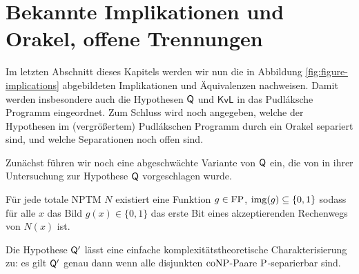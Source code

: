 \section{Bekannte Implikationen und Orakel, offene Trennungen}\label{sec:pudlak-overview}

Im letzten Abschnitt dieses Kapitels werden wir nun die in Abbildung \ref{fig:figure-implications} abgebildeten Implikationen und Äquivalenzen nachweisen.
Damit werden insbesondere auch die Hypothesen $\hQ$ und $\mathsf{KvL}$ in das Pudláksche Programm eingeordnet.
Zum Schluss wird noch angegeben, welche der Hypothesen im (vergrößertem) Pudlákschen Programm durch ein Orakel separiert sind, und welche Separationen noch offen sind.

Zunächst führen wir noch eine abgeschwächte Variante von $\hQ$ ein, die von \textcite{fenner_inverting_2003} in ihrer Untersuchung zur Hypothese $\hQ$ vorgeschlagen wurde.

\begin{conjecture}
    Für jede totale NPTM $N$ existiert eine Funktion $g\in\FP$, $\img(g)\subseteq\{0,1\}$ sodass für alle $x$ das Bild $g(x)\in\{0,1\}$ das erste Bit eines akzeptierenden Rechenwegs von $N(x)$ ist. 
\end{conjecture}
Die Hypothese $\hQ'$ lässt eine einfache komplexitätstheoretische Charakterisierung zu: es gilt $\hQ'$ genau dann wenn alle disjunkten $\coNP$-Paare $\P$-separierbar sind.

